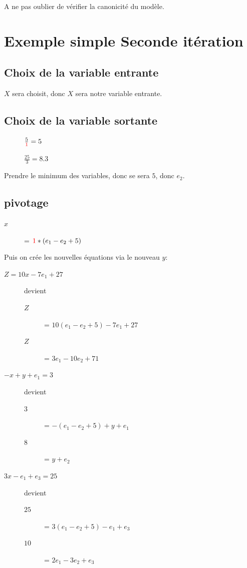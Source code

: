 A ne pas oublier de vérifier la canonicité du modèle.\\

\section{Exemple simple Seconde itération}
\subsection{Choix de la variable entrante}
$X$ sera choisit, donc $X$ sera notre variable entrante.\\

\subsection{Choix de la variable sortante}
\begin{description}
\item[] $\frac{5}{\textcolor{red}{1}} = 5$
\item[] $\frac{25}{3} = 8.3$
\end{description}
Prendre le minimum des variables, donc se sera $5$, donc $e_2$.\\

\subsection{pivotage}
\begin{description}
\item[$x$] = $\textcolor{red}{1}*(e_1 - e_2 + 5)$
\end{description}

Puis on crée les nouvelles équations via le nouveau $y$:
\begin{description}
\item[$Z = 10x - 7e_1 + 27$] devient
\begin{description}
\item[$Z$] = $10(e_1 - e_2 + 5) - 7e_1 + 27$
\item[$Z$] = $3e_1 - 10e_2 + 71$
\end{description}
\item[$-x + y + e_1 = 3$] devient
\begin{description}
\item[$3$] = $-(e_1 - e_2 + 5) + y + e_1$
\item[$8$] = $y + e_2$
\end{description}
\item[$3x - e_1 + e_3 = 25$] devient
\begin{description}
\item[$25$] = $3(e_1 - e_2 + 5) -e_1 + e_3$
\item[$10$] = $2e_1 - 3e_2 + e_3$
\end{description}
\end{description}

